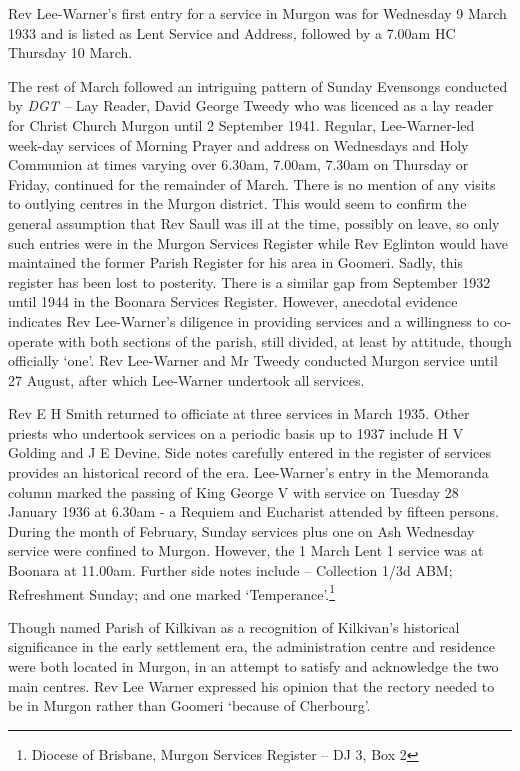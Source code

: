 Rev Lee-Warner's first entry for a service in Murgon was for Wednesday 9
March 1933 and is listed as Lent Service and Address\emph{,} followed by
a 7.00am HC Thursday 10 March.

The rest of March followed an intriguing pattern of Sunday Evensongs
conducted by \emph{DGT --} Lay Reader, David George Tweedy who was
licenced as a lay reader for Christ Church Murgon until 2 September
1941. Regular, Lee-Warner-led week-day services of Morning Prayer and
address on Wednesdays and Holy Communion at times varying over 6.30am,
7.00am, 7.30am on Thursday or Friday, continued for the remainder of
March. There is no mention of any visits to outlying centres in the
Murgon district. This would seem to confirm the general assumption that
Rev Saull was ill at the time, possibly on leave, so only such entries
were in the Murgon Services Register while Rev Eglinton would have
maintained the former Parish Register for his area in Goomeri. Sadly,
this register has been lost to posterity. There is a similar gap from
September 1932 until 1944 in the Boonara Services Register. However,
anecdotal evidence indicates Rev Lee-Warner's diligence in providing
services and a willingness to co-operate with both sections of the
parish, still divided, at least by attitude, though officially `one'.
Rev Lee-Warner and Mr Tweedy conducted Murgon service until 27 August,
after which Lee-Warner undertook all services.

Rev E H Smith returned to officiate at three services in March 1935.
Other priests who undertook services on a periodic basis up to 1937
include H V Golding and J E Devine. Side notes carefully entered in the
register of services provides an historical record of the era.
Lee-Warner's entry in the Memoranda column marked the passing of King
George V with service on Tuesday 28 January 1936 at 6.30am - a Requiem
and Eucharist attended by fifteen persons. During the month of February,
Sunday services plus one on Ash Wednesday service were confined to
Murgon. However, the 1 March Lent 1 service was at Boonara at 11.00am.
Further side notes include -- Collection 1/3d ABM; Refreshment Sunday;
and one marked `Temperance'.\footnote{Diocese of Brisbane, Murgon
  Services Register -- DJ 3, Box 2}

Though named Parish of Kilkivan as a recognition of Kilkivan's
historical significance in the early settlement era, the administration
centre and residence were both located in Murgon, in an attempt to
satisfy and acknowledge the two main centres. Rev Lee Warner expressed
his opinion that the rectory needed to be in Murgon rather than Goomeri
`because of Cherbourg'.

